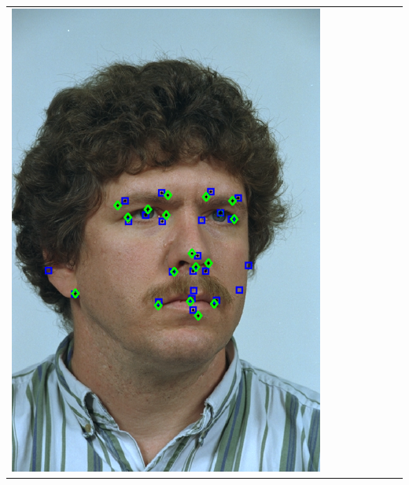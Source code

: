 \documentclass[landscape,final,a0paper,fontscale=0.27065]{baposter}
\begin{document}
\begin{poster}
{{\begin{tabular}{@{}rccccccc@{}}
 \parbox[c]{0.11\linewidth}{\includegraphics[width=\linewidth]{images/l_rc_success_1.pdf}} \\
 &

\end{tabular}}}
\end{poster}
\end{document}
